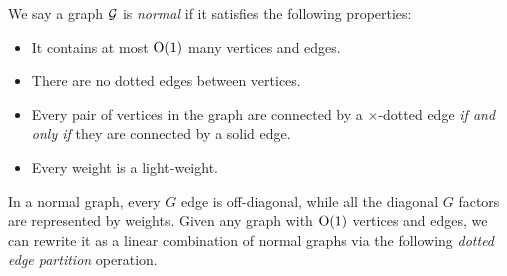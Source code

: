 \begin{definition}  \label{defnlvl0}  
We say a graph $\cal G$ is \emph{normal} if it satisfies the following properties:
\begin{itemize}
\item[(i)] It contains at most $\OO(1)$ many vertices and edges. %

\item[(ii)] There are no dotted edges between vertices.


\item[(iii)] Every pair of vertices in the graph are connected by a $\times$-dotted edge \emph{if and only if} they are connected by a solid edge.

\item[(iv)] Every weight is a light-weight.
\end{itemize}
\end{definition}

In a normal graph, every $G$ edge is off-diagonal, while all the diagonal $G$ factors are represented by weights. Given any graph with $\OO(1)$ vertices and edges, we can rewrite it as a linear combination of normal graphs via the following \emph{dotted edge partition} operation. 


